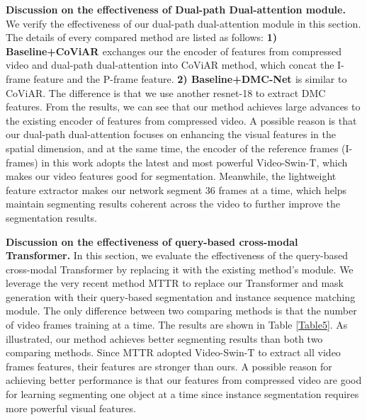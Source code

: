 \documentclass[sigconf]{acmart}
\begin{document}
{\textbf{Discussion on the effectiveness of Dual-path Dual-attention module.}} 
We verify the effectiveness of our dual-path dual-attention module in this section. The details of every compared method are listed as follows:
{\textbf{1) Baseline+CoViAR \cite{wu2018compressed}}} exchanges our the encoder of features from compressed video and dual-path dual-attention into CoViAR method, which concat the I-frame feature and the P-frame feature. 
{\textbf{2) Baseline+DMC-Net \cite{shou2019dmc}}} is similar to CoViAR. The difference is that we use another resnet-18 to extract DMC features. From the results, we can see that our method achieves large advances to the existing encoder of features from compressed video. A possible reason is that our dual-path dual-attention focuses on enhancing the visual features in the spatial dimension, and at the same time, the encoder of the reference frames (I-frames) in this work adopts the latest and most powerful Video-Swin-T, which makes our video features good for segmentation. Meanwhile, the lightweight feature extractor makes our network segment 36 frames at a time, which helps maintain segmenting results coherent across the video to further improve the segmentation results.



{\textbf{Discussion on the effectiveness of query-based cross-modal Transformer.}} In this section, we evaluate the effectiveness of the query-based cross-modal Transformer by replacing it with the existing method's module. We leverage the very recent method MTTR\cite{botach2021end} to replace our Transformer and mask generation with their query-based segmentation and instance sequence matching module. The only difference between two comparing methods is that the number of video frames training at a time. The results are shown in Table \ref{Table5}. As illustrated, our method achieves better segmenting results than both two comparing methods. Since MTTR adopted Video-Swin-T to extract all video frames features, their features are stronger than ours. A possible reason for achieving better performance is that our features from compressed video are good for learning segmenting one object at a time since instance segmentation requires more powerful visual features.

\begin{table}[t]
\centering
{}
\caption{The results of ablation studies on A2D Sentence to discuss on the effectiveness of query-based cross-modal Transformer.}
\label{Table5}
\end{table}
\end{document}

